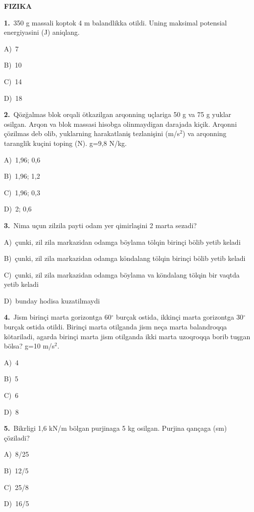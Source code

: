\documentclass[11pt,a4paper]{article}
\newcommand{\opt}[2]{\hspace*{4mm}#1)\ #2\par}
\begin{document}
\begin{center}{\Large\textbf{FIZIKA}}\end{center}
\noindent\begin{minipage}{\linewidth}
\textbf{1.}\ 350 g massali koptok 4 m balandlikka otildi. Uning maksimal potensial energiyasini (J) aniqlang.\par\smallskip
\opt{A}{7}
\opt{B}{10}
\opt{C}{14}
\opt{D}{18}
\end{minipage}\vspace{9pt}\par
\noindent\begin{minipage}{\linewidth}
\textbf{2.}\ Qözğalmas blok orqali ötkazilgan arqonning uçlariga 50 g va 75 g yuklar osilgan. Arqon va blok massasi hisobga olinmaydigan darajada kiçik. Arqonni çözilmas deb olib, yuklarning harakatlaniş tezlanişini (m/s$^{2}$) va arqonning taranglik kuçini toping (N). g=9,8 N/kg.\par\smallskip
\opt{A}{1,96; 0,6}
\opt{B}{1,96; 1,2}
\opt{C}{1,96; 0,3}
\opt{D}{2; 0,6}
\end{minipage}\vspace{9pt}\par
\noindent\begin{minipage}{\linewidth}
\textbf{3.}\ Nima uçun zilzila payti odam yer qimirlaşini 2 marta sezadi?\par\smallskip
\opt{A}{çunki, zil zila markazidan odamga böylama tölqin birinçi bölib yetib keladi}
\opt{B}{çunki, zil zila markazidan odamga köndalang tölqin birinçi bölib yetib keladi}
\opt{C}{çunki, zil zila markazidan odamga böylama va köndalang tölqin bir vaqtda yetib keladi}
\opt{D}{bunday hodisa kuzatilmaydi}
\end{minipage}\vspace{9pt}\par
\noindent\begin{minipage}{\linewidth}
\textbf{4.}\ Jism birinçi marta gorizontga 60$^\circ$ burçak ostida, ikkinçi marta gorizontga 30$^\circ$ burçak ostida otildi. Birinçi marta otilganda jism neça marta balandroqqa kötariladi, agarda birinçi marta jism otilganda ikki marta uzoqroqqa borib tuşgan bölsa? g=10 m/s$^{2}$.\par\smallskip
\opt{A}{4}
\opt{B}{5}
\opt{C}{6}
\opt{D}{8}
\end{minipage}\vspace{9pt}\par
\noindent\begin{minipage}{\linewidth}
\textbf{5.}\ Bikrligi 1,6 kN/m bölgan purjinaga 5 kg osilgan. Purjina qançaga (sm) çöziladi?\par\smallskip
\opt{A}{8/25}
\opt{B}{12/5}
\opt{C}{25/8}
\opt{D}{16/5}
\end{minipage}\vspace{9pt}\par
\end{document}
